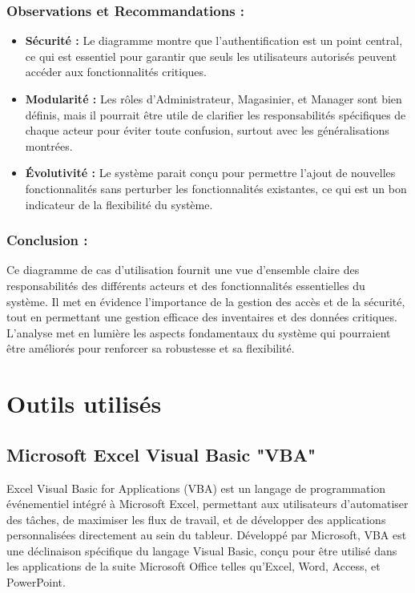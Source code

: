 \documentclass[a4paper, oneside, 12pt, final]{extreport}
\begin{document}
\subsubsection{Observations et Recommandations :}
\begin{itemize}
\item \textbf{Sécurité :} Le diagramme montre que l'authentification est un point central, ce qui est essentiel pour garantir que seuls les utilisateurs autorisés peuvent accéder aux fonctionnalités critiques.
\item \textbf{Modularité :} Les rôles d'Administrateur, Magasinier, et Manager sont bien définis, mais il pourrait être utile de clarifier les responsabilités spécifiques de chaque acteur pour éviter toute confusion, surtout avec les généralisations montrées.
\item \textbf{Évolutivité :} Le système parait conçu pour permettre l'ajout de nouvelles fonctionnalités sans perturber les fonctionnalités existantes, ce qui est un bon indicateur de la flexibilité du système.
\end{itemize}
\subsubsection{Conclusion :}
Ce diagramme de cas d'utilisation fournit une vue d'ensemble claire des responsabilités des différents acteurs et des fonctionnalités essentielles du système. Il met en évidence l'importance de la gestion des accès et de la sécurité, tout en permettant une gestion efficace des inventaires et des données critiques. L'analyse met en lumière les aspects fondamentaux du système qui pourraient être améliorés pour renforcer sa robustesse et sa flexibilité.
\section{Outils utilisés}
\subsection{Microsoft Excel Visual Basic "VBA"}
Excel Visual Basic for Applications (VBA) est un langage de programmation événementiel intégré à Microsoft Excel, permettant aux utilisateurs d'automatiser des tâches, de maximiser les flux de travail, et de développer des applications personnalisées directement au sein du tableur. Développé par Microsoft, VBA est une déclinaison spécifique du langage Visual Basic, conçu pour être utilisé dans les applications de la suite Microsoft Office telles qu'Excel, Word, Access, et PowerPoint.
\end{document}
